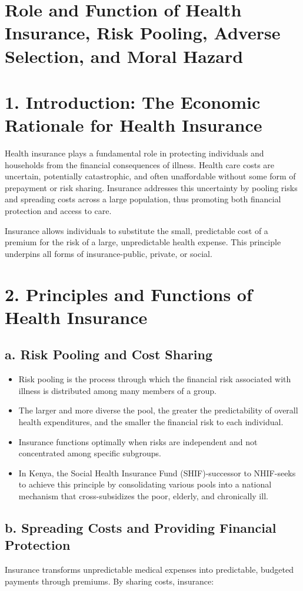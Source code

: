 \documentclass[10pt]{article}
\begin{document}
\section*{Role and Function of Health Insurance, Risk Pooling, Adverse Selection, and Moral Hazard}
\section*{1. Introduction: The Economic Rationale for Health Insurance}
Health insurance plays a fundamental role in protecting individuals and households from the financial consequences of illness. Health care costs are uncertain, potentially catastrophic, and often unaffordable without some form of prepayment or risk sharing. Insurance addresses this uncertainty by pooling risks and spreading costs across a large population, thus promoting both financial protection and access to care.

Insurance allows individuals to substitute the small, predictable cost of a premium for the risk of a large, unpredictable health expense. This principle underpins all forms of insurance-public, private, or social.

\section*{2. Principles and Functions of Health Insurance}
\subsection*{a. Risk Pooling and Cost Sharing}
\begin{itemize}
  \item Risk pooling is the process through which the financial risk associated with illness is distributed among many members of a group.
  \item The larger and more diverse the pool, the greater the predictability of overall health expenditures, and the smaller the financial risk to each individual.
  \item Insurance functions optimally when risks are independent and not concentrated among specific subgroups.
  \item In Kenya, the Social Health Insurance Fund (SHIF)-successor to NHIF-seeks to achieve this principle by consolidating various pools into a national mechanism that cross-subsidizes the poor, elderly, and chronically ill.
\end{itemize}

\subsection*{b. Spreading Costs and Providing Financial Protection}
Insurance transforms unpredictable medical expenses into predictable, budgeted payments through premiums. By sharing costs, insurance:
\end{document}
